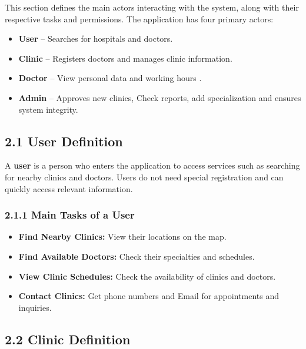\documentclass[12pt]{report}
\begin{document}
\noindent This section defines the main actors interacting with the system, along with their respective tasks and permissions. The application has four primary actors:
\begin{itemize}
	\item \textbf{User} – Searches for hospitals and doctors.
	\item \textbf{Clinic} – Registers doctors and manages clinic information.
	\item \textbf{Doctor} – View personal data and working hours .
	\item \textbf{Admin} – Approves new clinics, Check reports, add specialization and ensures system integrity.
\end{itemize}

\subsection*{\textbf{2.1 User Definition}}
\noindent A \textbf{user} is a person who enters the application to access services such as searching for nearby clinics and doctors. Users do not need special registration and can quickly access relevant information.

\subsubsection*{\textbf{2.1.1 Main Tasks of a User}}

\begin{itemize}
	\item \textbf{Find Nearby Clinics:} View their locations on the map.
	\item \textbf{Find Available Doctors:} Check their specialties and schedules.
	\item \textbf{View Clinic Schedules:} Check the availability of clinics and doctors.
	\item \textbf{Contact Clinics:} Get phone numbers and Email for appointments and inquiries.
\end{itemize}

\vspace{0.5cm}

\subsection*{\textbf{2.2 Clinic Definition}}
\end{document}
